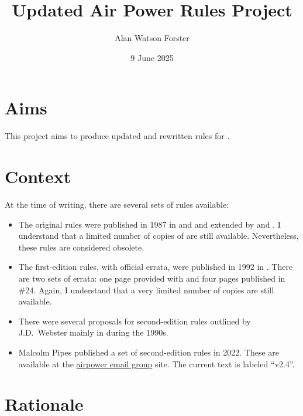 \documentclass[10pt]{report}
\title{Updated Air Power Rules Project}
\author{Alan Watson Forster}
\date{9 June 2025}
\begin{document}
\twocolumn
\thispagestyle{empty}
\maketitle
\suppressfloats

\section{Aims}

This project aims to produce updated and rewritten rules for {\AirPow}.

\section{Context}

At the time of writing, there are several sets of rules available:
\begin{itemize}
    \item The original rules were published in 1987 in {\AirSup} and {\AirStr}  and extended by {\DF} and {\EOTG}. I understand that a limited number of copies of {\AirSup} are still available. Nevertheless, these rules are considered obsolete.
    \item The first-edition {\AirPow} rules, with official errata, were published in 1992 in {\TSOH}. There are two sets of errata: one page provided with {\TSOH} and four pages published in {\APJ} \#24. Again, I understand that a very limited number of copies are still available.
    \item There were several proposals for second-edition rules outlined by J.D.\ Webster mainly in {\APJ} during the 1990s.
    \item Malcolm Pipes published a set of second-edition {\AirPow} rules in 2022. These are available at the \href{https://airpower.groups.io/g/main}{airpower email group} site. The current text is labeled “v2.4”.
\end{itemize}

\section{Rationale}
\end{document}
